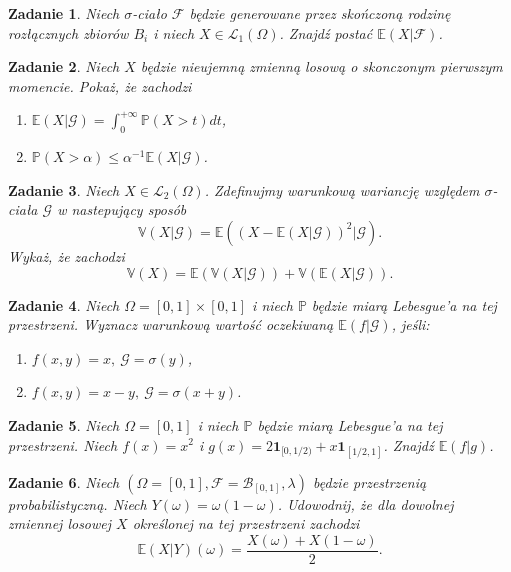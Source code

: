 \documentclass{mwart}
\newtheorem{zd}{Zadanie}
\begin{document}
\begin{zd}
Niech $\sigma$-ciało $\mathcal{F}$ będzie generowane przez skończoną rodzinę rozłącznych zbiorów $B_i$ i niech $X\in \mathcal{L}_1\left(\Omega\right)$. Znajdź postać $\mathbb{E}\left(X|\mathcal{F}\right)$.
\end{zd}

\begin{zd}
Niech $X$ będzie nieujemną zmienną losową o skonczonym pierwszym momencie. Pokaż, że zachodzi
\begin{enumerate}
\item $\mathbb{E}\left(X|\mathcal{G}\right)= \int_0^{+\infty}\mathbb{P}\left(X > t\right)dt$,
\item $\mathbb{P}\left(X > \alpha\right)\leq \alpha^{-1}\mathbb{E}\left(X|\mathcal{G}\right)$.
\end{enumerate}
\end{zd}

\begin{zd}
Niech $X \in \mathcal{L}_2\left(\Omega\right)$. Zdefinujmy warunkową wariancję względem $\sigma$- ciała $\mathcal{G}$ w nastepujący sposób
\begin{displaymath}
\mathbb{V}\left(X|\mathcal{G}\right) = \mathbb{E}\left(\left(X - \mathbb{E}\left(X|\mathcal{G}\right)\right)^2|\mathcal{G}\right).
\end{displaymath}
Wykaż, że zachodzi
\begin{displaymath}
\mathbb{V}\left(X\right) = \mathbb{E}\left(\mathbb{V}\left(X|\mathcal{G}\right)\right) + \mathbb{V}\left(\mathbb{E}\left(X|\mathcal{G}\right)\right).
\end{displaymath}
\end{zd}

\begin{zd}
Niech $\Omega = [0,1]\times[0,1]$ i niech $\mathbb{P}$ będzie miarą Lebesgue'a na tej przestrzeni. Wyznacz warunkową wartość oczekiwaną $\mathbb{E}\left(f|\mathcal{G}\right)$, jeśli:
\begin{enumerate}
\item $f(x,y) = x,\ \mathcal{G} = \sigma(y)$,
\item $f(x,y) = x - y,\ \mathcal{G} = \sigma(x+y)$.
\end{enumerate}
\end{zd}
\begin{zd}
Niech $\Omega = [0, 1]$ i niech $\mathbb{P}$ będzie miarą Lebesgue'a na tej przestrzeni. Niech $f(x) = x^2$ i $g(x) = 2\pmb{1}_{[0, 1/2)} + x\pmb{1}_{[1/2, 1]}$. Znajdź $\mathbb{E}\left(f|g\right)$.
\end{zd}
\begin{zd}
	Niech $(\Omega = [0,1], \mathcal{F} = \mathcal{B}_{[0,1]}, \lambda)$ będzie przestrzenią probabilistyczną. Niech $Y(\omega) = \omega(1-\omega)$. Udowodnij, że dla dowolnej zmiennej losowej $X$ określonej na tej przestrzeni zachodzi
	\begin{displaymath}
	 \mathbb{E}(X|Y)(\omega) = \frac{X(\omega) + X(1-\omega)}{2}.
	\end{displaymath}
\end{zd}
\end{document}
